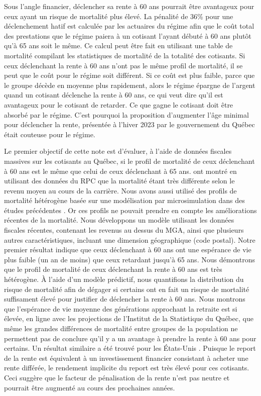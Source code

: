 \documentclass[french, 12pt]{article}
\begin{document}
	Sous l’angle financier, déclencher sa rente à 60 ans pourrait être avantageux pour ceux ayant un risque de mortalité plus élevé. La pénalité de 36\% pour une déclenchement hatif est calculée par  les actuaires du régime afin que le coût total des prestations que le régime paiera à un cotisant l’ayant débuté à 60 ans plutôt qu’à 65 ans soit le même. Ce calcul peut être fait en utilisant une table de mortalité compilant les statistiques de mortalité de la totalité des cotisants. Si ceux déclenchant la rente à 60 ans n’ont pas le même profil de mortalité, il se peut que le coût pour le régime soit différent. Si ce coût est plus faible, parce que le groupe décède en moyenne plus rapidement, alors le régime épargne de l’argent quand un cotisant déclenche la rente à 60 ans, ce qui veut dire qu’il est avantageux pour le cotisant de retarder. Ce que gagne le cotisant doit être absorbé par le régime.  C'est pourquoi la proposition d'augmenter l'âge minimal pour déclencher la rente, présentée à l'hiver 2023 par le gouvernement du Québec était couteuse pour le régime. 
    
    Le premier objectif de cette note est d'évaluer, à l’aide de données fiscales massives sur les cotisants au Québec, si le profil de mortalité de ceux déclenchant à 60 ans est le même que celui de ceux déclenchant à 65 ans. \citet{milliganschirle2021} ont montré en utilisant des données du RPC que la mortalité étant très différente selon le revenu moyen au cours de la carrière. Nous avons aussi utilisé des profils de mortalité hétérogène basée sur une modélisation par microsimulation dans des études précédentes \citep{glenzer2023,michaud2020}. Or ces profils ne pouvait prendre en compte les améliorations récentes de la mortalité. Nous développons un modèle utilisant les données fiscales récentes, contenant les revenus au dessus du MGA, ainsi que plusieurs autres caractéristiques, incluant une dimension géographique (code postal). Notre premier résultat indique que ceux déclenchant à 60 ans ont une espérance de vie plus faible (un an de moins) que ceux retardant jusqu’à 65 ans. Nous démontrons que le profil de mortalité de ceux déclenchant la rente à 60 ans est très hétérogène. À l'aide d'un modèle prédictif, nous quantifions la distribution du risque de mortalité afin de dégager si certains ont en fait un risque de mortalité suffisament élevé pour justifier de déclencher la rente à 60 ans. Nous montrons que l'espérance de vie moyenne des générations approchant la retraite est si élevée, en ligne avec les projections de l'Institut de la Statistique du Québec,  que même les grandes différences de mortalité entre groupes de la population ne permettent pas de conclure qu'il y a un avantage à prendre la rente à 60 ans
    pour certains. Un résultat similaire a été trouvé pour les États-Unis \citep{shoven_slavov_2014}. Puisque le report de la rente est équivalent à un investissement financier consistant à acheter une rente différée, le rendement implicite du report est très élevé pour ces cotisants. Ceci suggère que le facteur de pénalisation de la rente n'est pas neutre et pourrait être augmenté au cours des prochaines années. 
	
\end{document}
